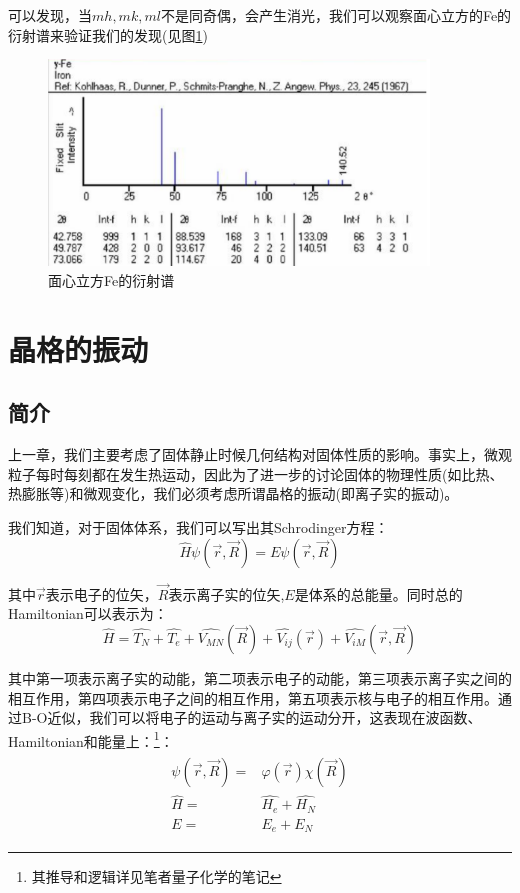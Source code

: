 \documentclass{ctexart}
\begin{document}
\begin{itemize}
            可以发现，当$mh,mk,ml$不是同奇偶，会产生消光，我们可以观察面心立方的Fe的衍射谱来验证我们的发现(见图\ref{fig:fccFediffraction})
            \begin{figure}[H]
                \centering
                \includegraphics[width=0.9\textwidth]{figure/面心立方Fe的衍射谱.png}
                \caption{面心立方Fe的衍射谱}
                \label{fig:fccFediffraction}
            \end{figure}
        \end{itemize}
        \newpage
    \section{晶格的振动}
        \subsection{简介}
        上一章，我们主要考虑了固体静止时候几何结构对固体性质的影响。事实上，微观粒子每时每刻都在发生热运动，因此为了进一步的讨论固体的物理性质(如比热、热膨胀等)和微观变化，我们必须考虑所谓晶格的振动(即离子实的振动)。
        
        我们知道，对于固体体系，我们可以写出其Schrodinger方程：
        \begin{equation}
            \hat{H}\psi(\vec{r},\vec{R})=E\psi(\vec{r},\vec{R})
        \end{equation}
        
        其中$\vec{r}$表示电子的位矢，$\vec{R}$表示离子实的位矢,$E$是体系的总能量。同时总的Hamiltonian可以表示为：
        \begin{equation}
            \hat{H}=\hat{T_N}+\hat{T_e}+\hat{V_{MN}}(\vec{R})+\hat{V_{ij}}(\vec{r})+\hat{V_{iM}}(\vec{r},\vec{R})
        \end{equation}
        
        其中第一项表示离子实的动能，第二项表示电子的动能，第三项表示离子实之间的相互作用，第四项表示电子之间的相互作用，第五项表示核与电子的相互作用。通过B-O近似，我们可以将电子的运动与离子实的运动分开，这表现在波函数、Hamiltonian和能量上：\footnote{其推导和逻辑详见笔者量子化学的笔记}：
        \begin{align}
            \begin{split}
                \psi(\vec{r},\vec{R})=&\varphi(\vec{r})\chi(\vec{R})\\
                \hat{H}=&\hat{H_e}+\hat{H_N}\\
                E=&E_e+E_N
            \end{split}
        \end{align}
        
\end{document}
